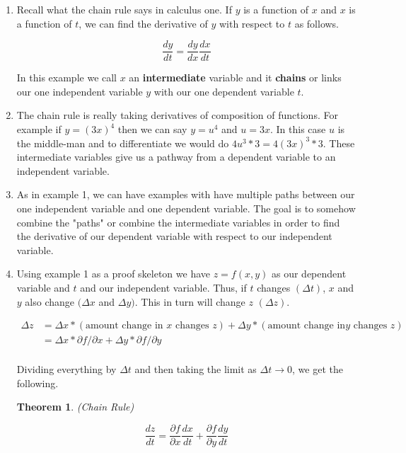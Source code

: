 \documentclass[11pt]{article}
\newtheorem{theorem}{Theorem}
\begin{document}
\begin{enumerate}
\item Recall what the chain rule says in calculus one. If $y$ is a function of $x$ and $x$ is a function of $t$, we can find the derivative of $y$ with respect to $t$ as follows.

\begin{equation*}
    \frac{dy}{dt} = \frac{dy}{dx} \frac{dx}{dt}
\end{equation*}

In this example we call $x$ an \textbf{intermediate} variable and it \textbf{chains} or links our one independent variable $y$ with our one dependent variable $t$.

\item  The chain rule is really taking derivatives of composition of functions. For example if $y = (3x)^4$ then we can say $y = u^4$ and $u = 3x$. In this case $u$ is the middle-man and to differentiate we would do $4u^3 * 3 = 4(3x)^3*3$. These intermediate variables give us a pathway from a dependent variable to an independent variable.

\item  As in example 1, we can have examples with have multiple paths between our one independent variable and one dependent variable. The goal is to somehow combine the "paths" or combine the intermediate variables in order to find the derivative of our dependent variable with respect to our independent variable.

\item Using example 1 as a proof skeleton we have $z = f(x,y)$ as our dependent variable and $t$ and our independent variable. Thus, if $t$ changes $(\Delta t)$, $x$ and $y$ also change $(\Delta x$ and $\Delta y)$. This in turn will change $z$ $(\Delta z)$.

\begin{align*}
    \Delta z &= \Delta x * (\text{amount change in } x \text{ changes } z) + \Delta y * (\text{amount change in} y \text{ changes } z)\\
    &= \Delta x * \partial f/ \partial x + \Delta y * \partial f/ \partial y\\
\end{align*}

Dividing everything by $\Delta t$ and then taking the limit as $\Delta t \to 0$, we get the following.
\begin{theorem}(Chain Rule)

\begin{equation*}
    \frac{dz}{dt} = \frac{\partial f}{\partial x} \frac{dx}{dt} + \frac{\partial f}{\partial y} \frac{dy}{dt}
\end{equation*}


\end{theorem}
\end{enumerate}
\end{document}
